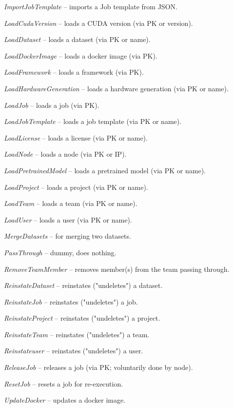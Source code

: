 \documentclass[a4paper]{book}
\begin{document}
\begin{tight_itemize}
  \item \textit{ImportJobTemplate} -- imports a Job template from JSON.
  \item \textit{LoadCudaVersion} -- loads a CUDA version (via PK or version).
  \item \textit{LoadDataset} -- loads a dataset (via PK or name).
  \item \textit{LoadDockerImage} -- loads a docker image (via PK).
  \item \textit{LoadFramework} -- loads a framework (via PK).
  \item \textit{LoadHardwareGeneration} -- loads a hardware generation (via PK or name).
  \item \textit{LoadJob} -- loads a job (via PK).
  \item \textit{LoadJobTemplate} -- loads a job template (via PK or name).
  \item \textit{LoadLicense} -- loads a license (via PK or name).
  \item \textit{LoadNode} -- loads a node (via PK or IP).
  \item \textit{LoadPretrainedModel} -- loads a pretrained model (via PK or name).
  \item \textit{LoadProject} -- loads a project (via PK or name).
  \item \textit{LoadTeam} -- loads a team (via PK or name).
  \item \textit{LoadUser} -- loads a user (via PK or name).
  \item \textit{MergeDatasets} -- for merging two datasets.
  \item \textit{PassThrough} -- dummy, does nothing.
  \item \textit{RemoveTeamMember} -- removes member(s) from the team passing through.
  \item \textit{ReinstateDataset} -- reinstates ("undeletes") a dataset.
  \item \textit{ReinstateJob} -- reinstates ("undeletes") a job.
  \item \textit{ReinstateProject} -- reinstates ("undeletes") a project.
  \item \textit{ReinstateTeam} -- reinstates ("undeletes") a team.
  \item \textit{Reinstateuser} -- reinstates ("undeletes") a user.
  \item \textit{ReleaseJob} -- releases a job (via PK; voluntarily done by node).
  \item \textit{ResetJob} -- resets a job for re-execution.
  \item \textit{UpdateDocker} -- updates a docker image.

\end{tight_itemize}
\end{document}
